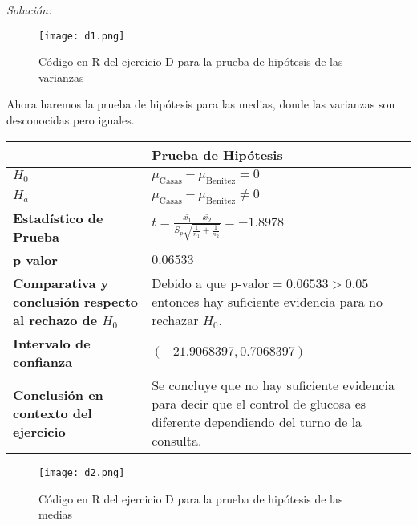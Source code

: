 \documentclass[12pt]{article}
\newenvironment{sol}
    {\emph{Solución:}
    }
    {
    }
\begin{document}
\begin{sol}
\pagebreak
\begin{figure}[h]  %
    \centering      %
    \texttt{[image: d1.png]} 
    \caption{Código en R del ejercicio D para la prueba de hipótesis de las varianzas}
\end{figure}
Ahora haremos la prueba de hipótesis para las medias, donde las varianzas son desconocidas pero iguales.

\begin{table}[h!]
\centering
\begin{tabular}{|>{\raggedright\arraybackslash}m{6cm}|>{\raggedright\arraybackslash}m{6cm}|}
\hline
 & \textbf{Prueba de Hipótesis} \\ \hline
$H_0$ & $\mu_{\text{Casas}}-\mu_{\text{Benitez}}=0$ \\ \hline
$H_a$ & $\mu_{\text{Casas}}-\mu_{\text{Benitez}}\neq0$ \\ \hline
\textbf{Estadístico de Prueba} & \vspace{0.5cm}$t=\frac{\bar{x_1}-\bar{x_2}}{S_p\sqrt{\frac{1}{n_1}+\frac{1}{n_2}}}=-1.8978$\vspace{0.5cm} \\ \hline
\textbf{p valor} & $0.06533$ \\ \hline
\textbf{Comparativa y conclusión respecto al rechazo de $H_0$} & Debido a que p-valor$=0.06533>0.05$ entonces hay suficiente evidencia para no rechazar $H_0$. \\ \hline
\textbf{Intervalo de confianza} & $(-21.9068397,0.7068397)$ \\ \hline
\textbf{Conclusión en contexto del ejercicio} & Se concluye que no hay suficiente evidencia para decir que el control de glucosa es diferente dependiendo del turno de la consulta. \\ \hline
\end{tabular}
\label{tab:hipotesis}
\end{table}
\pagebreak
\begin{figure}[h]  %
    \centering      %
    \texttt{[image: d2.png]} 
    \caption{Código en R del ejercicio D para la prueba de hipótesis de las medias}
\end{figure}
\end{sol}

\pagebreak

\end{document}
